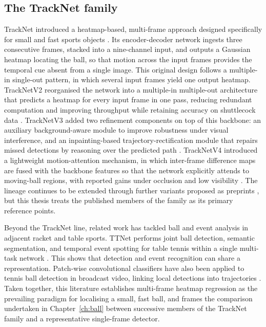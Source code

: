 \subsection{The TrackNet family}
\label{sec:rw-tracknet}

TrackNet introduced a heatmap-based, multi-frame approach designed
specifically for small and fast sports objects \cite{huang2019tracknet}.
Its encoder-decoder network ingests three consecutive frames, stacked into a
nine-channel input, and outputs a Gaussian heatmap locating the ball, so that
motion across the input frames provides the temporal cue absent from a single
image. This original design follows a multiple-in single-out pattern, in which
several input frames yield one output heatmap. TrackNetV2 reorganised the
network into a multiple-in multiple-out architecture that predicts a heatmap
for every input frame in one pass, reducing redundant computation and
improving throughput while retaining accuracy on shuttlecock data
\cite{sun2020tracknetv2}. TrackNetV3 added two refinement components on top of
this backbone: an auxiliary background-aware module to improve robustness under
visual interference, and an inpainting-based trajectory-rectification module
that repairs missed detections by reasoning over the predicted path
\cite{chen2023tracknetv3}. TrackNetV4 introduced a lightweight motion-attention
mechanism, in which inter-frame difference maps are fused with the backbone
features so that the network explicitly attends to moving-ball regions, with
reported gains under occlusion and low visibility \cite{raj2025tracknetv4}.
The lineage continues to be extended through further variants proposed as
preprints \cite{tang2025tracknetv5}, but this thesis treats the published
members of the family as its primary reference points.

Beyond the TrackNet line, related work has tackled ball and event analysis in
adjacent racket and table sports. TTNet performs joint ball detection, semantic
segmentation, and temporal event spotting for table tennis within a single
multi-task network \cite{voeikov2020ttnet}. This shows that detection and
event recognition can share a representation. Patch-wise convolutional
classifiers have also been applied to tennis ball detection in broadcast video,
linking local detections into trajectories \cite{reno2018cnntennis}. Taken
together, this literature establishes multi-frame heatmap regression as the
prevailing paradigm for localising a small, fast ball, and frames the
comparison undertaken in Chapter~\ref{ch:ball} between successive members of
the TrackNet family and a representative single-frame detector.

